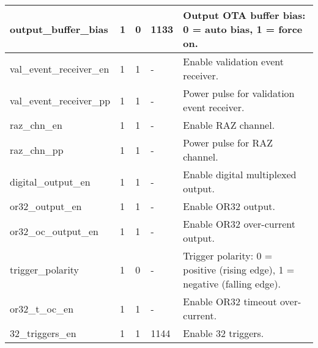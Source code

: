 \begin{longtable}{|p{6cm}|p{1cm}|p{1.4cm}|p{1.8cm}|p{5cm}|}
output\_buffer\_bias       & 1  & 0 & 1133 & Output OTA buffer bias: 0 = auto bias, 1 = force on. \\ \hline
val\_event\_receiver\_en    & 1  & 1 & -    & Enable validation event receiver. \\ \hline
val\_event\_receiver\_pp    & 1  & 1 & -    & Power pulse for validation event receiver. \\ \hline
raz\_chn\_en               & 1  & 1 & -    & Enable RAZ channel. \\ \hline
raz\_chn\_pp               & 1  & 1 & -    & Power pulse for RAZ channel. \\ \hline
digital\_output\_en        & 1  & 1 & -    & Enable digital multiplexed output. \\ \hline
or32\_output\_en           & 1  & 1 & -    & Enable OR32 output. \\ \hline
or32\_oc\_output\_en        & 1  & 1 & -    & Enable OR32 over-current output. \\ \hline
trigger\_polarity         & 1  & 0 & -    & Trigger polarity: 0 = positive (rising edge), 1 = negative (falling edge). \\ \hline
or32\_t\_oc\_en             & 1  & 1 & -    & Enable OR32 timeout over-current. \\ \hline
32\_triggers\_en           & 1  & 1 & 1144    & Enable 32 triggers. \\ \hline
\end{longtable}


